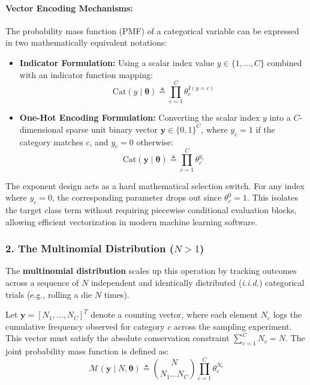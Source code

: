 \documentclass{article}
\begin{document}
\paragraph{Vector Encoding Mechanisms:}
The probability mass function (PMF) of a categorical variable can be expressed in two mathematically equivalent notations:
\begin{itemize}
    \item \textbf{Indicator Formulation:} Using a scalar index value $y \in \{1,\dots,C\}$ combined with an indicator function mapping:
    \begin{equation}
        \text{Cat}(y \mid \bm{\theta}) \triangleq \prod_{c=1}^{C} \theta_c^{I(y = c)}
    \end{equation}
    \item \textbf{One-Hot Encoding Formulation:} Converting the scalar index $y$ into a $C$-dimensional sparse unit binary vector $\bm{y} \in \{0,1\}^C$, where $y_c = 1$ if the category matches $c$, and $y_c = 0$ otherwise:
    \begin{equation}
        \text{Cat}(\bm{y} \mid \bm{\theta}) \triangleq \prod_{c=1}^{C} \theta_c^{y_c}
    \end{equation}
\end{itemize}

\begin{tcolorbox}[colback=blue!5!white, colframe=blue!60!black, title=Computational Insight]
The exponent design acts as a hard mathematical selection switch. For any index where $y_c = 0$, the corresponding parameter drops out since $\theta_c^0 = 1$. This isolates the target class term without requiring piecewise conditional evaluation blocks, allowing efficient vectorization in modern machine learning software.
\end{tcolorbox}

\subsubsection*{2. The Multinomial Distribution ($N > 1$)}
The \textbf{multinomial distribution} scales up this operation by tracking outcomes across a sequence of $N$ independent and identically distributed (\textit{i.i.d.}) categorical trials (e.g., rolling a die $N$ times).

Let $\bm{y} = [N_1, \dots, N_C]^T$ denote a counting vector, where each element $N_c$ logs the cumulative frequency observed for category $c$ across the sampling experiment. This vector must satisfy the absolute conservation constraint $\sum_{c=1}^C N_c = N$. The joint probability mass function is defined as:
\begin{equation}
    \mathcal{M}(\bm{y} \mid N, \bm{\theta}) \triangleq \binom{N}{N_1 \dots N_C} \prod_{c=1}^{C} \theta_c^{N_c}
\end{equation}
\end{document}
